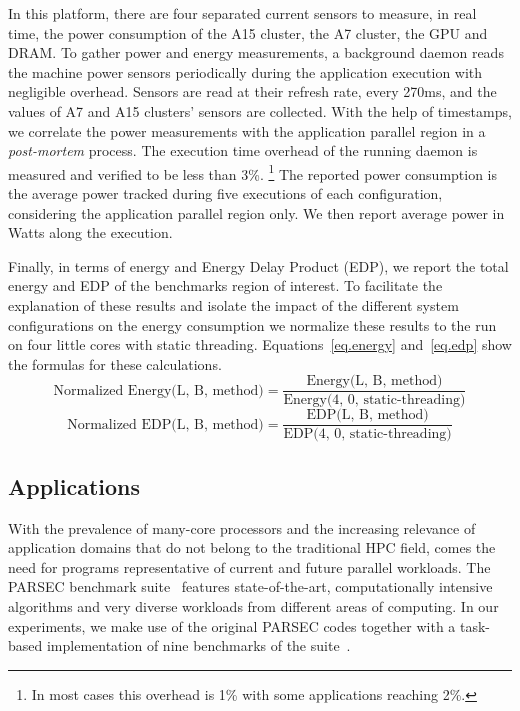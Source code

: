 In this platform, there are four separated current sensors to measure, in real time, the power consumption of the A15 cluster, the A7 cluster, the GPU and DRAM. 
To gather power and energy measurements, a background daemon reads the machine power 
sensors periodically during the application execution with negligible overhead. 
Sensors are read at their refresh rate, every 270ms, and the values of A7 and A15 clusters' sensors are collected.
With the help of timestamps, we correlate the power measurements with the application parallel region in a \emph{post-mortem} process.
The execution time overhead of the running daemon is measured and verified to be less than 3\%. \footnote{In most cases this overhead is 1\% with some applications reaching 2\%.}
The reported power consumption is the average power tracked during five executions of each configuration, considering the application parallel region only. 
We then report average power in Watts along the execution. 

Finally, in terms of energy and Energy Delay Product (EDP), we report the total energy and EDP of 
the benchmarks region of interest.
To facilitate the explanation of these results and isolate the impact of the different system configurations on the energy consumption we normalize these results to the run on four little cores with static threading.
Equations~\ref{eq.energy} and~\ref{eq.edp} show the formulas for these calculations.
\begingroup\makeatletter\def\f@size{8}\check@mathfonts
\begin{equation}
  \text{Normalized Energy(L, B, method)} = \frac{\text{Energy(L, B, method)}}{\text{Energy(4, 0, static-threading)}}
  \label{eq.energy}
\end{equation}
\begin{equation}
  \text{Normalized EDP(L, B, method)} = \frac{\text{EDP(L, B, method)}}{\text{EDP(4, 0, static-threading)}}
  \label{eq.edp}
\end{equation}
\endgroup




\subsection{Applications}
\label{sec:parsec}

With the prevalence of many-core processors and the increasing relevance of application 
domains that do not belong to the traditional HPC field, comes the need for programs 
representative of current and future parallel workloads. 
The PARSEC benchmark suite~\cite{PARSEC3,Bienia:PhD2011} features state-of-the-art, 
computationally intensive algorithms and very diverse workloads from different areas of computing.
In our experiments, we make use of the original PARSEC codes together with a task-based 
implementation of nine benchmarks of the suite~\cite{Chasapis:TACO2016}. 

